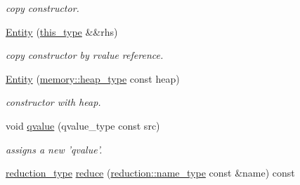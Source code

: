 \begin{DoxyCompactItemize}
\begin{DoxyCompactList}\small\item\em copy constructor. \end{DoxyCompactList}\item 
\hypertarget{classhryky_1_1http_1_1header_1_1accept_1_1params_1_1_entity_a1b91413b6713879e4a644173ec802f38}{\hyperlink{classhryky_1_1http_1_1header_1_1accept_1_1params_1_1_entity_a1b91413b6713879e4a644173ec802f38}{Entity} (\hyperlink{classhryky_1_1http_1_1header_1_1accept_1_1params_1_1_entity_a1d1bd4e3329e61ed7ad02693efc341b9}{this\-\_\-type} \&\&rhs)}\label{classhryky_1_1http_1_1header_1_1accept_1_1params_1_1_entity_a1b91413b6713879e4a644173ec802f38}

\begin{DoxyCompactList}\small\item\em copy constructor by rvalue reference. \end{DoxyCompactList}\item 
\hypertarget{classhryky_1_1http_1_1header_1_1accept_1_1params_1_1_entity_ae7331f3c9563ce57a9fa0518384c6fb4}{\hyperlink{classhryky_1_1http_1_1header_1_1accept_1_1params_1_1_entity_ae7331f3c9563ce57a9fa0518384c6fb4}{Entity} (\hyperlink{classhryky_1_1memory_1_1heap_1_1_base}{memory\-::heap\-\_\-type} const heap)}\label{classhryky_1_1http_1_1header_1_1accept_1_1params_1_1_entity_ae7331f3c9563ce57a9fa0518384c6fb4}

\begin{DoxyCompactList}\small\item\em constructor with heap. \end{DoxyCompactList}\item 
\hypertarget{classhryky_1_1http_1_1header_1_1accept_1_1params_1_1_entity_a01141a7fae976c8a5ed5de55eb5d7349}{void \hyperlink{classhryky_1_1http_1_1header_1_1accept_1_1params_1_1_entity_a01141a7fae976c8a5ed5de55eb5d7349}{qvalue} (qvalue\-\_\-type const src)}\label{classhryky_1_1http_1_1header_1_1accept_1_1params_1_1_entity_a01141a7fae976c8a5ed5de55eb5d7349}

\begin{DoxyCompactList}\small\item\em assigns a new 'qvalue'. \end{DoxyCompactList}\item 
\hypertarget{classhryky_1_1http_1_1header_1_1accept_1_1params_1_1_entity_aaf909219dfeb3a1a01961b6cea43579d}{\hyperlink{namespacehryky_a343a9a4c36a586be5c2693156200eadc}{reduction\-\_\-type} \hyperlink{classhryky_1_1http_1_1header_1_1accept_1_1params_1_1_entity_aaf909219dfeb3a1a01961b6cea43579d}{reduce} (\hyperlink{namespacehryky_1_1reduction_ac686c30a4c8d196bbd0f05629a6b921f}{reduction\-::name\-\_\-type} const \&name) const }\label{classhryky_1_1http_1_1header_1_1accept_1_1params_1_1_entity_aaf909219dfeb3a1a01961b6cea43579d}


\end{DoxyCompactItemize}
